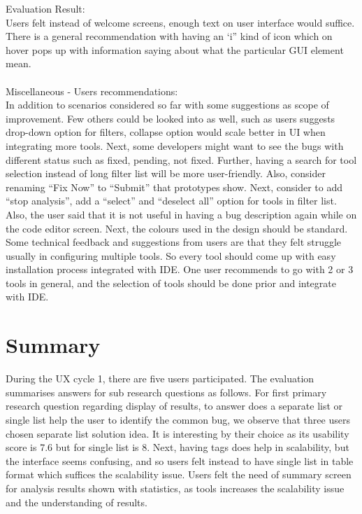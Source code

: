 Evaluation Result: \\

Users felt instead of welcome screens, enough text on user interface would suffice. There is a general recommendation with having an ‘i” kind of icon which on hover pops up with information saying about what the particular GUI element mean. \\ \\

Miscellaneous - Users recommendations: \\

In addition to scenarios considered so far with some suggestions as scope of improvement. Few others could be looked into as well, such as users suggests drop-down option for filters, collapse option would scale better in UI when integrating more tools. Next, some developers might want to see the bugs with different status such as fixed, pending, not fixed. Further, having a search for tool selection instead of long filter list will be more user-friendly. Also, consider renaming “Fix Now” to “Submit” that prototypes show. Next, consider to add “stop analysis”, add a “select” and “deselect all” option for tools in filter list. Also, the user said that it is not useful in having a bug description again while on the code editor screen. Next, the colours used in the design should be standard. Some technical feedback and suggestions from users are that they felt struggle usually in configuring multiple tools. So every tool should come up with easy installation process integrated with IDE. One user recommends to go with 2 or 3 tools in general, and the selection of tools should be done prior and integrate with IDE.

\section{Summary}

During the UX cycle 1, there are five users participated. The evaluation summarises answers for sub research questions as follows. For first primary research question regarding display of results, to answer does a separate list or single list help the user to identify the common bug, we observe that three users chosen separate list solution idea. It is interesting by their choice as its usability score is 7.6 but for single list is 8. Next, having tags does help in scalability, but the interface seems confusing, and so users felt instead to have single list in table format which suffices the scalability issue. Users felt the need of summary screen for analysis results shown with statistics, as tools increases the scalability issue and the understanding of results. \\ \\
   
